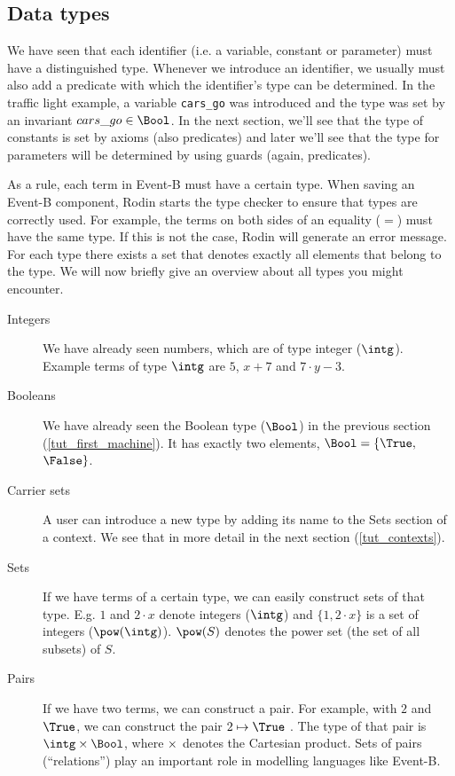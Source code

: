 \subsection{Data types}
\label{tut_data_types}
We have seen that each identifier (i.e. a variable, constant or parameter) must have a distinguished type.
Whenever we introduce an identifier, we usually must also add a predicate with which the
identifier's type can be determined. In the traffic light example, a variable \texttt{cars\_go} was
introduced and the type was set by an invariant $cars\_go \in \Bool$. In the next section, we'll see that the type of constants is set by axioms (also predicates) and later we'll see that the type for parameters will be determined by using guards (again, predicates).

As a rule, each term in Event-B must have a certain type. 
When saving an Event-B component, Rodin starts the type checker to ensure that types are correctly used. For example, the terms on both sides of an equality ($=$) must have the same type. If this is not the case, Rodin will generate an error message.
For each type there exists a set that denotes exactly all elements that belong to the type. We will now briefly
give an overview about all types you might encounter.

\begin{description}
\item[Integers] 
  We have already seen numbers, which are of type integer ($\intg$).
  Example terms of type $\intg$ are $5$, $x+7$ and $7 \cdot y - 3$.
\item[Booleans]
  We have already seen the Boolean type ($\Bool$) in the previous section (\ref{tut_first_machine}).
  It has exactly two elements, $\Bool = \{\True,$ $\False\}$.
\item[Carrier sets]
  A user can introduce a new type by adding its name to the
  \textsf{Sets} section of a context. We see that in more detail in the next section (\ref{tut_contexts}).
\item[Sets]
  If we have terms of a certain type, we can easily construct sets of that type.
  E.g. $1$ and $2\cdot x$ denote integers ($\intg$) and $\{1,2\cdot x\}$ is a set of integers ($\pow(\intg)$).
  $\pow(S)$  denotes the power set (the set of all subsets) of $S$.
\item[Pairs]
  If we have two terms, we can construct a pair. For example, with $2$ and $\True$, we
  can construct the pair $2\mapsto\True$ .
  The type of that pair is $\intg\cprod\Bool$, where $\mathbin\times$ denotes the Cartesian product.
  Sets of pairs (``relations'') play an important role in modelling languages like Event-B.
\end{description}

